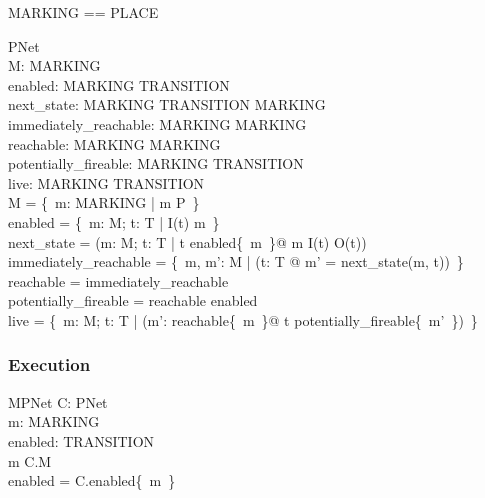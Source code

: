 \documentclass[a4paper,11pt]{article}
\begin{document}
\begin{zed}
MARKING == \bag PLACE							\\
\end{zed}

\newcommand{\pnet}{PNet}
\newcommand{\mpnet}{MPNet}
\newcommand{\irf}{\mathrel{\mbox{\sf immediately\_reachable\_from}}}

\begin{schema}{\pnet}
	\pnets								\\
	M: \power MARKING						\\
	enabled: MARKING \rel TRANSITION				\\
	next\_state: MARKING \cross TRANSITION \pfun MARKING		\\
 	immediately\_reachable: MARKING \rel MARKING			\\
 	reachable: MARKING \rel MARKING					\\
	potentially\_fireable: MARKING \rel TRANSITION			\\
	live: MARKING \rel TRANSITION					\\
\where
	M = \{~m: MARKING | \dom m \subseteq P~\}			\\
	enabled = \{~m: M; t: T | I(t) \subbageq m~\}			\\
	next\_state = (\lambda m: M; t: T | t \in enabled\limg\{~m~\}\rimg @ 
		m \uminus I(t) \uplus O(t))				\\
	immediately\_reachable = \{~m, m': M | 
		(\exists t: T @ m' = next\_state(m, t))~\}		\\
	reachable = immediately\_reachable \star			\\
	potentially\_fireable = reachable \comp enabled			\\
	live = \{~m: M; t: T |
		(\forall m': reachable\limg\{~m~\}\rimg @
			t \in potentially\_fireable\limg\{~m'~\}\rimg)~\}\\
\end{schema}

\newpage
\subsubsection*{Execution}

\begin{schema}{\mpnet}
	C: \pnet							\\
	m: MARKING							\\
	enabled: \power TRANSITION					\\
\where
	m \in C.M							\\
	enabled = C.enabled\limg\{~m~\}\rimg				\\
\end{schema}
\end{document}

